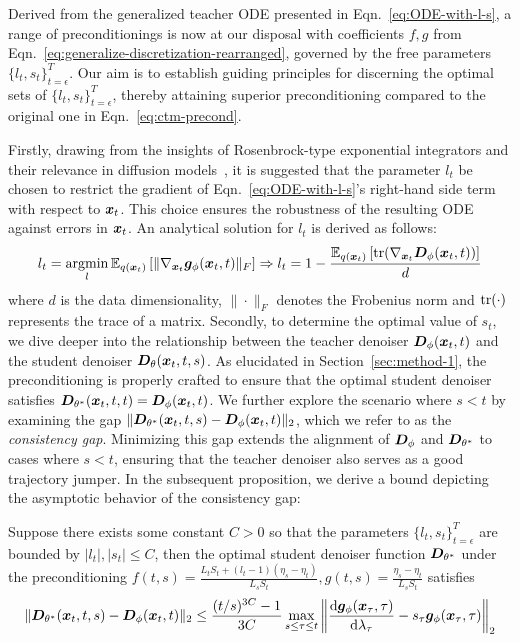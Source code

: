 Derived from the generalized teacher ODE presented in Eqn.~\eqref{eq:ODE-with-l-s}, a range of preconditionings is now at our disposal with coefficients $f,g$ from Eqn.~\eqref{eq:generalize-discretization-rearranged}, governed by the free parameters $\{l_t,s_t\}_{t=\epsilon}^T$. Our aim is to establish guiding principles for discerning the optimal sets of $\{l_t,s_t\}_{t=\epsilon}^T$, thereby attaining superior preconditioning compared to the original one in Eqn.~\eqref{eq:ctm-precond}.

Firstly, drawing from the insights of Rosenbrock-type exponential integrators and their relevance in diffusion models~\citep{hochbruck2010exponential,hochbruck2009exponential,zheng2023dpm}, it is suggested that the parameter $l_t$ be chosen to restrict the gradient of Eqn.~\eqref{eq:ODE-with-l-s}'s right-hand side term with respect to $\bm{x}_t$. This choice ensures the robustness of the resulting ODE against errors in $\bm{x}_t$. An analytical solution for $l_t$ is derived as follows:
\begin{equation}
\label{eq:l-solution}
l_t=\argmin_{l}\E_{q(\x_t)}\left[\|\nabla_{\x_t}\gv_\phi(\x_t,t)\|_F\right]\Rightarrow l_t=1-\frac{\E_{q(\x_t)}\left[\tr(\nabla_{\x_t}\Dv_\phi(\x_t,t))\right]}{d}
\end{equation}
where $d$ is the data dimensionality, $\|\cdot\|_F$ denotes the Frobenius norm and $\mathrm{tr}(\cdot)$ represents the trace of a matrix. Secondly, to determine the optimal value of $s_t$, we dive deeper into the relationship between the teacher denoiser $\bm{D}_\phi(\bm{x}_t,t)$ and the student denoiser $\bm{D}_\theta(\bm{x}_t,t,s)$. As elucidated in Section~\ref{sec:method-1}, the preconditioning is properly crafted to ensure that the optimal student denoiser satisfies $\bm{D}_{\theta^*}(\bm{x}_t,t,t)=\bm{D}_\phi(\bm{x}_t,t)$. We further explore the scenario where $s<t$ by examining the gap $\|\bm{D}_{\theta^*}(\bm{x}_t,t,s)-\bm{D}_\phi(\bm{x}_t,t)\|_2$, which we refer to as the \textit{consistency gap}. Minimizing this gap extends the alignment of $\bm{D}_\phi$ and $\bm{D}_{\theta^*}$ to cases where $s<t$, ensuring that the teacher denoiser also serves as a good trajectory jumper. In the subsequent proposition, we derive a bound depicting the asymptotic behavior of the consistency gap:
\begin{proposition}
\label{proposition:gap}
Suppose there exists some constant $C>0$ so that the parameters $\{l_t,s_t\}_{t=\epsilon}^T$ are bounded by $|l_t|,|s_t|\leq C$, then the optimal student denoiser function $\bm{D}_{\theta^*}$ under the preconditioning $f(t,s)=\frac{L_tS_t+(l_t-1)(\eta_s-\eta_t)}{L_sS_t}, g(t,s)=\frac{\eta_s-\eta_t}{L_sS_t}$ satisfies
\begin{equation}
    \|\bm{D}_{\theta^*}(\bm{x}_t,t,s)-\bm{D}_\phi(\bm{x}_t,t)\|_2\leq \frac{(t/s)^{3C}-1}{3C}\max_{s\leq \tau\leq t} \left\|\frac{\mathrm{d}\bm{g}_\phi(\bm{x}_\tau,\tau)}{\mathrm{d}\lambda_\tau}-s_\tau\bm{g}_\phi(\bm{x}_\tau,\tau)\right\|_2
\end{equation}
\end{proposition}

